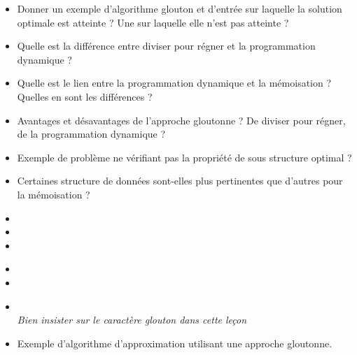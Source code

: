 \documentclass{agregfiche}
\begin{document}
\secquestionsclassiques

\begin{itemize}
    \item Donner un exemple d'algorithme glouton et d'entrée sur
    laquelle la solution optimale est atteinte ? Une sur laquelle
    elle n'est pas atteinte ?
    \item Quelle est la différence entre diviser pour régner et la programmation dynamique ?
    \item Quelle est le lien entre la programmation dynamique et la mémoisation ? Quelles en sont les différences ?
    \item Avantages et désavantages de l'approche gloutonne ? De diviser pour régner, de la programmation dynamique ?
    \item Exemple de problème ne vérifiant pas la propriété de sous
    structure optimal ?
    \item Certaines structure de données sont-elles plus pertinentes
    que d'autres pour la mémoisation ?
\end{itemize}

\secreferences

\begin{itemize}
    \item 
    \item 
    \item 
\end{itemize}

\secdev

\begin{itemize}
    \item 
    \item 
    \item 
      \textit{\\Bien insister sur le caractère glouton dans cette leçon}
    \item Exemple d'algorithme d'approximation utilisant une approche gloutonne.
\end{itemize}
\end{document}

